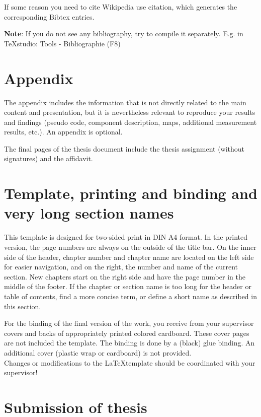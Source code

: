 If some reason you need to cite Wikipedia use \glqq citation\grqq, which generates the corresponding Bibtex entries.

\textbf{Note}: If you do not see any bibliography, try to compile it separately. E.g. in TeXstudio: Tools - Bibliographie (F8)

\section{Appendix}
\label{hinweise:anhang}

The appendix includes the information that is not directly related to the main content and presentation, but it is nevertheless relevant to reproduce your results and findings (pseudo code, component description, maps, additional measurement results, etc.). An appendix is optional.

The final pages of the thesis document include the thesis assignment (without signatures)  and the affidavit.

\section[Template, printing and binding]{Template, printing and binding and very long section names}
\label{hinweise:vorlage}

This template is designed for two-sided print in DIN A4 format.
In the printed version, the page numbers are always on the outside of the title bar.
On the inner side of the header, chapter number and chapter name are located on the left side for easier navigation, and on the right, the number and name of the current section.
New chapters start on the right side and have the page number in the middle of the footer.
If the chapter or section name is too long for the header or table of contents, find a more concise term, or define a short name as described in this section.

For the binding of the final version of the work, you receive from your supervisor covers and backs of appropriately printed colored cardboard.
These cover pages are not included the template.
The binding is done by a (black) glue binding.
An additional cover (plastic wrap or cardboard) is not provided. \\

Changes or modifications to the \LaTeX template should be coordinated with your supervisor! \\


\section{Submission of thesis}
\label{hinweise:abgabe}

